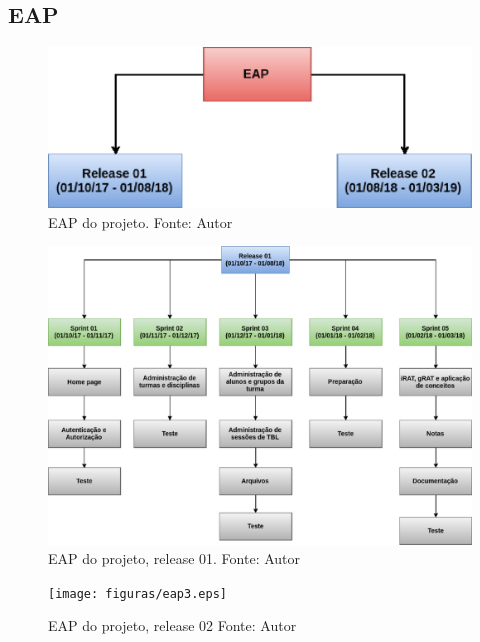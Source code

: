 \begin{apendicesenv}

\partapendices

\chapter{EAP} \label{apendice:eap}

\begin{figure}[h!]
	\centering
  \includegraphics[keepaspectratio=true,scale=0.8]{figuras/eap1.eps}
  \caption[EAP do projeto.]{EAP do projeto. Fonte: Autor}
	\label{fig:eap}
\end{figure}

\begin{figure}[h!]
	\centering
  \includegraphics[keepaspectratio=true,scale=0.4]{figuras/eap2.eps}
  \caption[EAP do projeto, release 01]{EAP do projeto, release 01. Fonte: Autor}
	\label{fig:eap}
\end{figure}

\begin{figure}[h!]
	\centering
  \texttt{[image: figuras/eap3.eps]}
  \caption[EAP do projeto, release 02.]{EAP do projeto, release 02 Fonte: Autor}
	\label{fig:eap}
\end{figure}


\end{apendicesenv}
